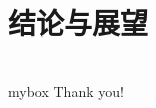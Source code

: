 \documentclass[10pt,aspectratio=43,mathserif]{beamer}
\begin{document}
    \section[总结]{结论与展望}
\section*{}
            \begin{frame}
                \begin{center}
                    \begin{minipage}{1\textwidth}
                        \begin{beamercolorbox}[wd=0.70\textwidth, rounded=true, shadow=true]{mybox}
                        \LARGE \centering Thank you!
                        \end{beamercolorbox}
                    \end{minipage}
                \end{center}
            \end{frame}
\end{document}
